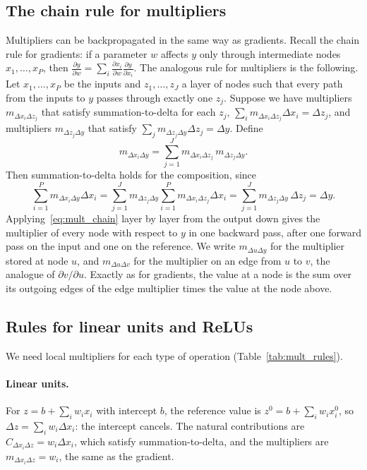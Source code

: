 \subsection{The chain rule for multipliers}

Multipliers can be backpropagated in the same way as gradients. Recall the chain rule for gradients: if a parameter $w$ affects $y$ only through intermediate nodes $x_1,\dots,x_P$, then $\frac{\partial y}{\partial w}=\sum_i\frac{\partial x_i}{\partial w}\frac{\partial y}{\partial x_i}$. The analogous rule for multipliers is the following. Let $x_1,\dots,x_P$ be the inputs and $z_1,\dots,z_J$ a layer of nodes such that every path from the inputs to $y$ passes through exactly one $z_j$. Suppose we have multipliers $m_{\Delta x_i\Delta z_j}$ that satisfy summation-to-delta for each $z_j$, $\sum_i m_{\Delta x_i\Delta z_j}\Delta x_i=\Delta z_j$, and multipliers $m_{\Delta z_j\Delta y}$ that satisfy $\sum_j m_{\Delta z_j\Delta y}\Delta z_j=\Delta y$. Define
\begin{equation}
  m_{\Delta x_i\Delta y} = \sum_{j=1}^J m_{\Delta x_i\Delta z_j}\, m_{\Delta z_j\Delta y}.
  \label{eq:mult_chain}
\end{equation}
Then summation-to-delta holds for the composition, since
\begin{equation}
  \sum_{i=1}^P m_{\Delta x_i\Delta y}\Delta x_i
  = \sum_{j=1}^J m_{\Delta z_j\Delta y}\sum_{i=1}^P m_{\Delta x_i\Delta z_j}\Delta x_i
  = \sum_{j=1}^J m_{\Delta z_j\Delta y}\,\Delta z_j = \Delta y .
\end{equation}
Applying~\eqref{eq:mult_chain} layer by layer from the output down gives the multiplier of every node with respect to $y$ in one backward pass, after one forward pass on the input and one on the reference. We write $m_{\Delta u\Delta y}$ for the multiplier stored at node $u$, and $m_{\Delta u\Delta v}$ for the multiplier on an edge from $u$ to $v$, the analogue of $\partial v/\partial u$. Exactly as for gradients, the value at a node is the sum over its outgoing edges of the edge multiplier times the value at the node above.

\subsection{Rules for linear units and ReLUs}

We need local multipliers for each type of operation (Table~\ref{tab:mult_rules}).

\paragraph{Linear units.} For $z=b+\sum_i w_ix_i$ with intercept $b$, the reference value is $z^0=b+\sum_iw_ix_i^0$, so $\Delta z=\sum_i w_i\Delta x_i$: the intercept cancels. The natural contributions are $C_{\Delta x_i\Delta z}=w_i\Delta x_i$, which satisfy summation-to-delta, and the multipliers are $m_{\Delta x_i\Delta z}=w_i$, the same as the gradient.

